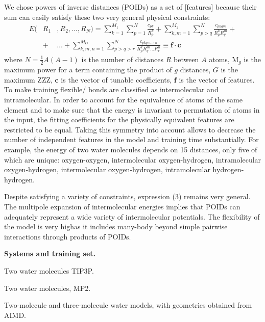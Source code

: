 \documentclass[aps,prl,reprint,amsmath,amssymb,nature]{revtex4-1}
\begin{document}
We chose powers of inverse distances (POIDs) as a set of [features] because their sum can easily satisfy these two very general physical constraints:
\begin{eqnarray}
E (&R_1&, R_2, \ldots, R_N) = \sum_{k=1}^{M_1} \sum_{p=1}^{N} \frac{c_{pk}}{R_p^k} + \sum_{k,m=1}^{M_2} \sum_{p>q}^{N} \frac{c_{pkqm}}{R_p^k R_q^m} + \nonumber \\
&+& \ldots +\sum_{k,m,n=1}^{M_G} \sum_{p>q>r}^{N} \frac{c_{pkqm\ldots rn}}{R_p^k R_q^m \ldots R_r^n} \equiv \mathbf{f}\cdot \mathbf{c}
\end{eqnarray}
%
where $N = \frac{1}{2}A(A-1)$ is the number of distances $R$ between $A$ atoms, M$_{g}$ is the maximum power for a term containing the product of $g$ distances, $G$ is the maximum ZZZ, $\mathbf{c}$ is the vector of tunable coefficients, $\mathbf{f}$ is the vector of features. 
\red To make training flexible/ bonds are classified as intermolecular and intramolecular. \old 
In order to account for the equivalence of atoms of the same element and to make sure that the energy is invariant to permutation of atoms in the input, the fitting coefficients for the physically equivalent features are restricted to be equal. 
Taking this symmetry into account allows to decrease the number of independent features in the model and training time substantially. 
For example, the energy of two water molecules depends on 15 distances, only five of which are unique: oxygen-oxygen, intermolecular oxygen-hydrogen, intramolecular oxygen-hydrogen, intermolecular oxygen-hydrogen, intramolecular hydrogen-hydrogen.

Despite satisfying a variety of constraints, expression (3) remains very general. 
The multipole expansion of intermolecular energies implies that POIDs can adequately represent a wide variety of intermolecular potentials. 
The flexibility of the model \red is very high\old as it includes many-body beyond simple pairwise interactions through products 
of POIDs.

\textbf{Systems and training set.} 


Two water molecules TIP3P.

Two water molecules, MP2.

Two-molecule and three-molecule water models, with geometries obtained 
from AIMD.
\end{document}
